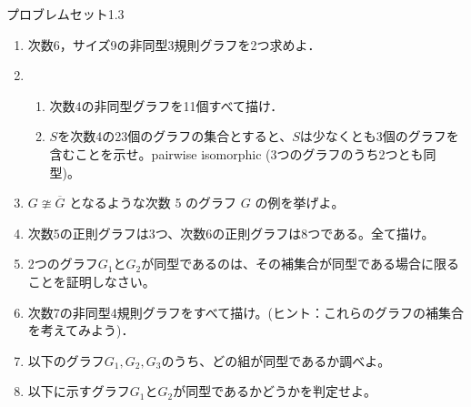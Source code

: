 プロブレムセット1.3

\begin{enumerate}
  \item 次数6，サイズ9の非同型3規則グラフを2つ求めよ．
  \item \begin{enumerate}
    \item 次数4の非同型グラフを11個すべて描け．
    \item $S$を次数4の23個のグラフの集合とすると、$S$は少なくとも3個のグラフを含むことを示せ。pairwise isomorphic (3つのグラフのうち2つとも同型)。
  \end{enumerate}
  \item $G \ncong \overline{G}$ となるような次数 5 のグラフ $G$ の例を挙げよ。 
  \item 次数5の正則グラフは3つ、次数6の正則グラフは8つである。全て描け。
  \item 2つのグラフ$G_1$と$G_2$が同型であるのは、その補集合が同型である場合に限ることを証明しなさい。
  \item 次数7の非同型4規則グラフをすべて描け。(ヒント：これらのグラフの補集合を考えてみよう)．
  \item 以下のグラフ$G_1, G_2, G_3$のうち、どの組が同型であるか調べよ。
  \item 以下に示すグラフ$G_1$と$G_2$が同型であるかどうかを判定せよ。
\end{enumerate}

